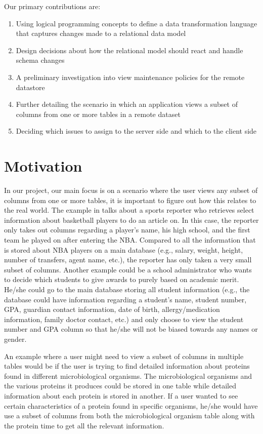 \documentclass[12pt]{article}
\begin{document}
\noindent Our primary contributions are:
\begin{enumerate}
	\item{Using logical programming concepts to define a data transformation language that captures changes made to a relational data model}
	\item{Design decisions about how the relational model should react and handle schema changes}
	\item{A preliminary investigation into view maintenance policies for the remote datastore}
	\item{Further detailing the scenario in which an application views a subset of columns from one or more tables in a remote dataset}
	\item{Deciding which issues to assign to the server side and which to the client side}
\end{enumerate}

\section{Motivation}
In our project, our main focus is on a scenario where the user views any subset of columns from one or more tables, it is important to figure out how this relates to the real world. The example in \cite{arniThesis} talks about a sports reporter who retrieves select information about basketball players to do an article on. In this case, the reporter only takes out columns regarding a player's name, his high school, and the first team he played on after entering the NBA. Compared to all the information that is stored about NBA players on a main database (e.g., salary, weight, height, number of transfers, agent name, etc.), the reporter has only taken a very small subset of columns. Another example could be a school administrator who wants to decide which students to give awards to purely based on academic merit. He/she could go to the main database storing all student information (e.g., the database could have information regarding a student's name, student number, GPA, guardian contact information, date of birth, allergy/medication information, family doctor contact, etc.) and only choose to view the student number and GPA column so that he/she will not be biased towards any names or gender.

An example where a user might need to view a subset of columns in multiple tables would be if the user is trying to find detailed information about proteins found in different microbiological organisms. The microbiological organisms and the various proteins it produces could be stored in one table while detailed information about each protein is stored in another. If a user wanted to see certain characteristics of a protein found in specific organisms, he/she would have use a subset of columns from both the microbiological organism table along with the protein time to get all the relevant information.
\end{document}
